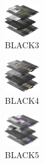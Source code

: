 \hspace{0.1cm}
\begin{minipage}[b]{0.15\linewidth}
\begin{figure}[H]                                                          
  \centering                                                             
  \begin{adjustbox}{width=1.5cm,center}                                   
  \includegraphics[width=1.5cm]{src/colorspace_colourflow/flows/colourflow_3-45.png}%
  \end{adjustbox}                                                        
\caption*{BLACK3}                                           
\end{figure}                                                               
\end{minipage}
\hspace{0.1cm}
\begin{minipage}[b]{0.15\linewidth}
\begin{figure}[H]                                                          
  \centering                                                             
  \begin{adjustbox}{width=1.5cm,center}                                   
  \includegraphics[width=1.5cm]{src/colorspace_colourflow/flows/colourflow_4-45.png}%
  \end{adjustbox}                                                        
\caption*{BLACK4}                                           
\end{figure}                                                               
\end{minipage}
\hspace{0.1cm}
\begin{minipage}[b]{0.15\linewidth}
\begin{figure}[H]                                                          
  \centering                                                             
  \begin{adjustbox}{width=1.5cm,center}                                   
  \includegraphics[width=1.5cm]{src/colorspace_colourflow/flows/colourflow_5-45.png}%
  \end{adjustbox}                                                        
\caption*{BLACK5}                                           
\end{figure}                                                               
\end{minipage}
